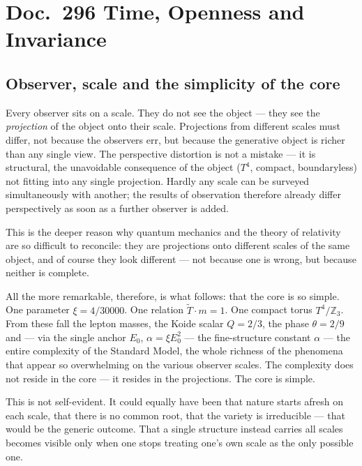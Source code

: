 
\section*{Doc.~296 \quad Time, Openness and Invariance}

\subsection*{Observer, scale and the simplicity of the core}

Every observer sits on a scale. They do not see the object --- they see the
\emph{projection} of the object onto their scale. Projections from different
scales must differ, not because the observers err, but because the generative
object is richer than any single view. The perspective distortion is not a
mistake --- it is structural, the unavoidable consequence of the object
($T^4$, compact, boundaryless) not fitting into any single projection.
Hardly any scale can be surveyed simultaneously with another; the results of
observation therefore already differ perspectively as soon as a further
observer is added.

This is the deeper reason why quantum mechanics and the theory of relativity
are so difficult to reconcile: they are projections onto different scales of
the same object, and of course they look different --- not because one is
wrong, but because neither is complete.

All the more remarkable, therefore, is what follows: that the core is so
simple. One parameter $\xi = 4/30000$. One relation $\tilde{T} \cdot m = 1$.
One compact torus $T^4/\mathbb{Z}_3$. From these fall the lepton masses,
the Koide scalar $Q = 2/3$, the phase $\theta = 2/9$ and --- via the single
anchor $E_0$, $\alpha = \xi E_0^2$ --- the fine-structure constant $\alpha$
--- the entire complexity of the Standard Model, the whole
richness of the phenomena that appear so overwhelming on the various observer
scales. The complexity does not reside in the core --- it resides in the
projections. The core is simple.

This is not self-evident. It could equally have been that nature starts afresh
on each scale, that there is no common root, that the variety is irreducible
--- that would be the generic outcome. That a single structure instead carries
all scales becomes visible only when one stops treating one's own scale as the
only possible one.

